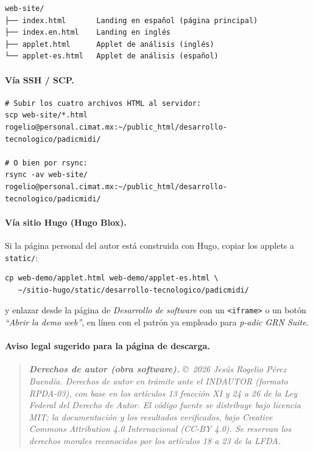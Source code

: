 \documentclass[11pt,a4paper,oneside]{article}
\theoremstyle{plain}
\theoremstyle{definition}
\theoremstyle{remark}
\newcommand{\code}[1]{\texttt{\small #1}}
\begin{document}
\begin{lstlisting}[style=plain]
web-site/
├── index.html       Landing en español (página principal)
├── index.en.html    Landing en inglés
├── applet.html      Applet de análisis (inglés)
└── applet-es.html   Applet de análisis (español)
\end{lstlisting}

\paragraph{Vía SSH / SCP.}

\begin{lstlisting}[style=shell]
# Subir los cuatro archivos HTML al servidor:
scp web-site/*.html rogelio@personal.cimat.mx:~/public_html/desarrollo-tecnologico/padicmidi/

# O bien por rsync:
rsync -av web-site/ rogelio@personal.cimat.mx:~/public_html/desarrollo-tecnologico/padicmidi/
\end{lstlisting}

\paragraph{Vía sitio Hugo (Hugo Blox).} Si la página personal del autor
está construida con Hugo, copiar los applets a \code{static/}:

\begin{lstlisting}[style=shell]
cp web-demo/applet.html web-demo/applet-es.html \
   ~/sitio-hugo/static/desarrollo-tecnologico/padicmidi/
\end{lstlisting}

y enlazar desde la página de \emph{Desarrollo de software} con un
\code{<iframe>} o un botón \emph{``Abrir la demo web''}, en línea con
el patrón ya empleado para \emph{p-adic GRN Suite}.

\paragraph{Aviso legal sugerido para la página de descarga.}

\begin{quote}\itshape
\textbf{Derechos de autor (obra software).} \copyright\ 2026
Jesús Rogelio Pérez Buendía. Derechos de autor en trámite ante el
INDAUTOR (formato RPDA-03), con base en los artículos 13 fracción XI y
24 a 26 de la Ley Federal del Derecho de Autor. El código fuente se
distribuye bajo \emph{licencia MIT}; la documentación y los resultados
verificados, bajo \emph{Creative Commons Attribution 4.0 Internacional}
(CC-BY 4.0). Se reservan los derechos morales reconocidos por los
artículos 18 a 23 de la LFDA.
\end{quote}
\end{document}
